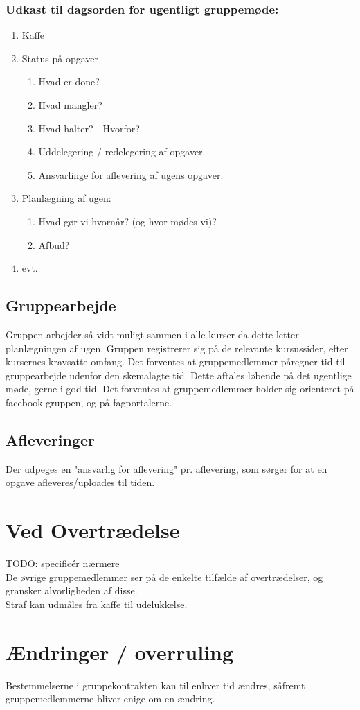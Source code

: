 \documentclass[a4paper,oneside,article]{memoir}
\begin{document}
\subsubsection{Udkast til dagsorden for ugentligt gruppemøde:}
\begin{enumerate}
\item Kaffe
\item Status på opgaver
\begin{enumerate}
\item Hvad er done?
\item Hvad mangler?
\item Hvad halter? - Hvorfor?
\item Uddelegering / redelegering af opgaver.
\item Ansvarlinge for aflevering af ugens opgaver.
\end{enumerate}
\item Planlægning af ugen:
\begin{enumerate}
\item Hvad gør vi hvornår? (og hvor mødes vi)?
\item Afbud?
\end{enumerate}
\item evt.
\end{enumerate}
\subsection{Gruppearbejde}
Gruppen arbejder så vidt muligt sammen i alle kurser da dette letter planlægningen af ugen.
Gruppen registrerer sig på de relevante kursussider, efter kursernes kravsatte omfang.
Det forventes at gruppemedlemmer påregner tid til gruppearbejde udenfor den skemalagte tid. Dette aftales løbende på det ugentlige møde, gerne i god tid.
Det forventes at gruppemedlemmer holder sig orienteret på facebook gruppen, og på fagportalerne.
\subsection{Afleveringer}
Der udpeges en "ansvarlig for aflevering"  pr. aflevering, som sørger for at en opgave afleveres/uploades til tiden.
\section{Ved Overtrædelse}
TODO: specificér nærmere\\
De øvrige gruppemedlemmer ser på de enkelte tilfælde af overtrædelser, og gransker alvorligheden af disse.\\
Straf kan udmåles fra kaffe til udelukkelse.
\section{Ændringer / overruling}
Bestemmelserne i gruppekontrakten kan til enhver tid ændres, såfremt gruppemedlemmerne bliver enige om en ændring.
\end{document}
